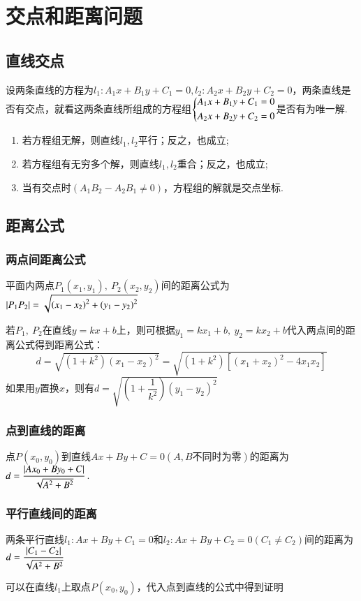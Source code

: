 \documentclass{BHCexam}
\begin{document}
\section{交点和距离问题} 
\subsection{直线交点}
设两条直线的方程为$ l_1:A_1x+B_1y+C_1=0,l_2:A_2x+B_2y+C_2=0 $，两条直线是否有交点，就看这两条直线所组成的方程组$\begin{dcases}
A_1x+B_1y+C_1=0\\A_2x+B_2y+C_2=0
\end{dcases}$是否有为唯一解.
\begin{enumerate}[1)]
\item 若方程组无解，则直线$ l_1,l_2 $平行；反之，也成立;
\item 若方程组有无穷多个解，则直线$ l_1,l_2 $重合；反之，也成立;
\item 当有交点时$\left( A_1B_2-A_2B_1\ne0 \right)$，方程组的解就是交点坐标.
\end{enumerate}
\subsection{距离公式}
\subsubsection{两点间距离公式}
平面内两点$ P_1(x_1,y_1) ,\ P_2(x_2,y_2)$间的距离公式为$ \left| P_1P_2 \right|=\sqrt{\left(x_1-x_2\right)^2+\left(y_1-y_2\right)^2} $\par 
{\kaishu 若$ P_1,\ P_2 $在直线$ y=kx+b $上，则可根据$ y_1=kx_1+b,\ y_2=kx_2+b $代入两点间的距离公式得到距离公式：\[d=\sqrt{\left(1+k^2\right)\left(x_1-x_2\right)^2}=\sqrt{\left(1+k^2\right)\left[\left(x_1+x_2\right)^2-4x_1x_2\right]}\]
如果用$ y $置换$ x $，则有$ d=\sqrt{\left(1+\dfrac{1}{k^2}\right)(y_1-y_2)^2} $}

\subsubsection{点到直线的距离}
点$ P(x_0,y_0) $到直线$ Ax+By+C=0 (A,B\text{不同时为零})$的距离为$ d=\dfrac{\left| Ax_0+By_0+C \right|}{\sqrt{A^2+B^2}} $.
\subsubsection{平行直线间的距离}
两条平行直线$l_1: Ax+By+C_1=0 $和$l_2: Ax+By+C_2=0 (C_1\ne C_2)$间的距离为$ d=\dfrac{\left| C_1-C_2 \right|}{\sqrt{A^2+B^2}} $\par
{\kaishu 可以在直线$ l_1 $上取点$ P(x_0,y_0) $，代入点到直线的公式中得到证明}
  
\end{document}
